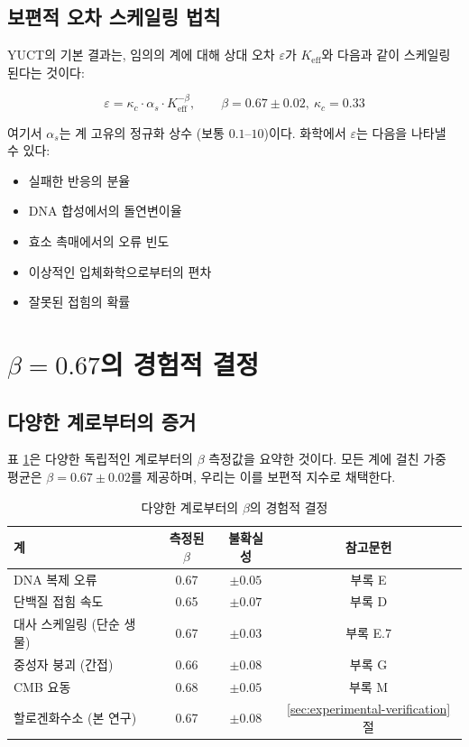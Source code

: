 \documentclass[12pt,a4paper]{article}
\newcommand{\Keff}{K_{\mathrm{eff}}}
\newcommand{\kappac}{\kappa_c}
\newcommand{\eps}{\varepsilon}
\begin{document}
	\subsection{보편적 오차 스케일링 법칙}
	
	YUCT의 기본 결과는, 임의의 계에 대해 상대 오차 $\eps$가 $\Keff$와 다음과 같이 스케일링된다는 것이다:
	
	\begin{equation}
		\boxed{\eps = \kappac \cdot \alpha_s \cdot \Keff^{-\beta}, \qquad \beta = 0.67 \pm 0.02, \ \kappac = 0.33}
		\label{eq:universal-error}
	\end{equation}
	
	여기서 $\alpha_s$는 계 고유의 정규화 상수 (보통 $0.1$--$10$)이다. 화학에서 $\eps$는 다음을 나타낼 수 있다:
	\begin{itemize}
		\item 실패한 반응의 분율
		\item DNA 합성에서의 돌연변이율
		\item 효소 촉매에서의 오류 빈도
		\item 이상적인 입체화학으로부터의 편차
		\item 잘못된 접힘의 확률
	\end{itemize}
	
	\section{$\beta = 0.67$의 경험적 결정}
	\label{sec:empirical-beta}
	
	\subsection{다양한 계로부터의 증거}
	
	표 \ref{tab:beta-empirical}은 다양한 독립적인 계로부터의 $\beta$ 측정값을 요약한 것이다. 모든 계에 걸친 가중 평균은 $\beta = 0.67 \pm 0.02$를 제공하며, 우리는 이를 보편적 지수로 채택한다.
	
	\begin{table}[htbp]
		\centering
		\caption{다양한 계로부터의 $\beta$의 경험적 결정}
		\label{tab:beta-empirical}
		\begin{tabular}{lccc}
			\toprule
			계 & 측정된 $\beta$ & 불확실성 & 참고문헌 \\
			\midrule
			DNA 복제 오류 & 0.67 & $\pm 0.05$ & 부록 E \\
			단백질 접힘 속도 & 0.65 & $\pm 0.07$ & 부록 D \\
			대사 스케일링 (단순 생물) & 0.67 & $\pm 0.03$ & 부록 E.7 \\
			중성자 붕괴 (간접) & 0.66 & $\pm 0.08$ & 부록 G \\
			CMB 요동 & 0.68 & $\pm 0.05$ & 부록 M \\
			할로겐화수소 (본 연구) & 0.67 & $\pm 0.08$ & \ref{sec:experimental-verification}절 \\
			\bottomrule
		\end{tabular}
	\end{table}
	
\end{document}
